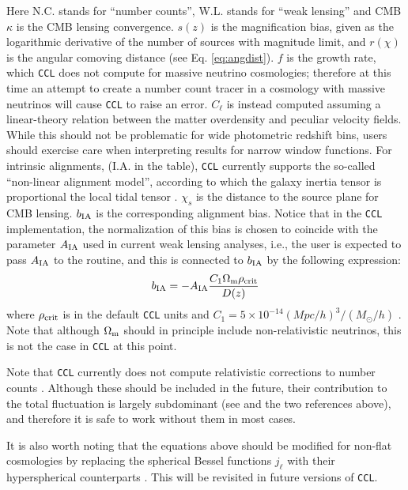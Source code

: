 \documentclass[\docopts]{\docclass}
\newcommand{\ccl}{{\tt CCL}\xspace}
\begin{document}
  Here N.C. stands for ``number counts'', W.L. stands for ``weak lensing'' and CMB $\kappa$ is the CMB lensing convergence. $s(z)$ is the magnification bias, given as the logarithmic derivative of the number of sources with magnitude limit, and $r(\chi)$ is the angular comoving distance (see Eq. \ref{eq:angdist}). $f$ is the growth rate, which \ccl does not compute for massive neutrino cosmologies; therefore at this time an attempt to create a number count tracer in a cosmology with massive neutrinos will cause \ccl to raise an error. $C_\ell$ is instead computed assuming a linear-theory relation between the matter overdensity and peculiar velocity fields. While this should not be problematic for wide photometric redshift bins, users should exercise care when interpreting results for narrow window functions. For intrinsic alignments, (I.A. in the table), \ccl currently supports the so-called ``non-linear alignment model'', according to which the galaxy inertia tensor is proportional the local tidal tensor \cite{2004PhRvD..70f3526H,2007MNRAS.381.1197H}. $\chi_s$ is the distance to the source plane for CMB lensing. $b_{\rm IA}$ is the corresponding alignment bias. Notice that in the \ccl implementation, the normalization of this bias is chosen to coincide with the parameter $A_{\rm IA}$ used in current weak lensing analyses, i.e., the user is expected to pass $A_{\rm IA}$ to the routine, and this is connected to $b_{\rm IA}$ by the following expression\cite[Eq. 6]{Joachimi11}:
  \begin{equation}
    b_{\rm IA} = - A_{\rm IA} \frac{C_1 \Omega_{\rm m} \rho_{\rm crit}}{D(z)}
  \end{equation}
where $\rho_{\rm crit}$ is in the default \ccl units and $C_1= 5\times 10^{-14} (Mpc/h)^3 / (M_\odot/h)$ \citep{Brown02,Bridle07}. Note that although $\Omega_{\rm m}$ should in principle include non-relativistic neutrinos, this is not the case in \ccl at this point. 


  Note that \ccl currently does not compute relativistic corrections to number counts \cite{2011PhRvD..84d3516C,2011PhRvD..84f3505B}. Although these should be included in the future, their contribution to the total fluctuation is largely subdominant (see \cite{GReffects} and the two references above), and therefore it is safe to work without them in most cases.

  It is also worth noting that the equations above should be modified for non-flat cosmologies by replacing the spherical Bessel functions $j_\ell$ with their hyperspherical counterparts \cite{1994ApJ...432....7K}. This will be revisited in future versions of \ccl.
  
\end{document}
